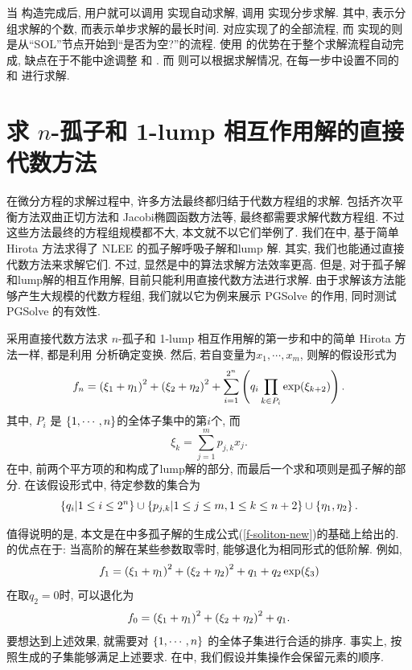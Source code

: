 当  构造完成后, 用户就可以调用  实现自动求解, 调用  实现分步求解. 其中, 表示分组求解的个数, 而表示单步求解的最长时间.   对应实现了的全部流程, 而  实现的则是从``SOL''节点开始到``是否为空?''的流程. 使用  的优势在于整个求解流程自动完成, 缺点在于不能中途调整  和 . 而  则可以根据求解情况, 在每一步中设置不同的  和  进行求解. 

\section{求 $n$-孤子和 1-lump 相互作用解的直接代数方法}
在微分方程的求解过程中, 许多方法最终都归结于代数方程组的求解. 包括齐次平衡方法\D 双曲正切方法和 Jacobi椭圆函数方法等, 最终都需要求解代数方程组. 不过这些方法最终的方程组规模都不大, 本文就不以它们举例了. 我们在中, 基于简单 Hirota 方法求得了 NLEE 的孤子解\D 呼吸子解和lump 解. 其实, 我们也能通过直接代数方法来求解它们. 不过, 显然是中的算法求解方法效率更高. 但是, 对于孤子解和lump解的相互作用解, 目前只能利用直接代数方法进行求解. 由于求解该方法能够产生大规模的代数方程组, 我们就以它为例来展示 PGSolve 的作用, 同时测试 PGSolve 的有效性. 

采用直接代数方法求 $n$-孤子和 1-lump 相互作用解的第一步和中的简单 Hirota 方法一样, 都是利用 \Painleve{} 分析确定变换. 然后, 若自变量为$x_1,\cdots,x_m$, 则解的假设形式为
\begin{equation}
f_n=\left(\xi_1+\eta_1\right)^2+\left(\xi_2+\eta_2\right)^2+\sum_{i=1}^{2^n}\left(q_i\prod_{k \in P_i}{\exp(\xi_{k+2})}\right). \label{f-ns1l}
\end{equation}
其中, $P_i$ 是 $\left\{1,\cdots,n\right\}$的全体子集中的第$i$个, 而
\begin{equation}
\xi_k=\sum_{j=1}^m{p_{j,k}x_j}.
\end{equation}
在中, 前两个平方项的和构成了lump解的部分, 而最后一个求和项则是孤子解的部分. 在该假设形式中, 待定参数的集合为
\begin{equation}
    \left\{q_i|1\le i \le 2^n\right\} \cup \left\{p_{j,k}|1\le j \le m, 1\le k \le n+2\right\} \cup \left\{\eta_1,\eta_2\right\}. 
\end{equation}

值得说明的是, 本文是在中多孤子解的生成公式(\ref{f-soliton-new})的基础上给出的. 的优点在于: 当高阶的解在某些参数取零时, 能够退化为相同形式的低阶解. 例如,
\begin{equation}
    f_1=\left(\xi_1+\eta_1\right)^2+\left(\xi_2+\eta_2\right)^2+q_1+q_2 \exp(\xi_3)
\end{equation}
在取$q_2=0$时, 可以退化为
\begin{equation}
    f_0=\left(\xi_1+\eta_1\right)^2+\left(\xi_2+\eta_2\right)^2+q_1.
\end{equation}
要想达到上述效果, 就需要对 $\left\{1,\cdots,n\right\}$ 的全体子集进行合适的排序. 事实上, 按照生成的子集能够满足上述要求. 在中, 我们假设并集操作会保留元素的顺序. 

